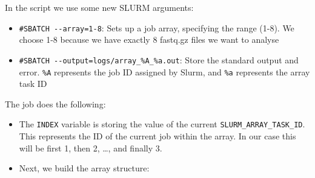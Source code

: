 \documentclass[
  letterpaper,
  DIV=11,
  numbers=noendperiod]{scrreprt}
\newenvironment{Shaded}{}{}
\newcommand{\AttributeTok}[1]{\textcolor[rgb]{0.84,0.23,0.29}{#1}}
\newcommand{\BuiltInTok}[1]{\textcolor[rgb]{0.84,0.23,0.29}{#1}}
\newcommand{\CommentTok}[1]{\textcolor[rgb]{0.42,0.45,0.49}{#1}}
\newcommand{\ExtensionTok}[1]{\textcolor[rgb]{0.84,0.23,0.29}{\textbf{#1}}}
\newcommand{\FunctionTok}[1]{\textcolor[rgb]{0.44,0.26,0.76}{#1}}
\newcommand{\KeywordTok}[1]{\textcolor[rgb]{0.84,0.23,0.29}{#1}}
\newcommand{\NormalTok}[1]{\textcolor[rgb]{0.14,0.16,0.18}{#1}}
\newcommand{\OperatorTok}[1]{\textcolor[rgb]{0.14,0.16,0.18}{#1}}
\newcommand{\PreprocessorTok}[1]{\textcolor[rgb]{0.84,0.23,0.29}{#1}}
\newcommand{\StringTok}[1]{\textcolor[rgb]{0.01,0.18,0.38}{#1}}
\newcommand{\VariableTok}[1]{\textcolor[rgb]{0.89,0.38,0.04}{#1}}
\providecommand{\tightlist}{%
  \setlength{\itemsep}{0pt}\setlength{\parskip}{0pt}}\usepackage{longtable,booktabs,array}
\begin{document}
\begin{tcolorbox}
\begin{Shaded}
\end{Shaded}

In the script we use some new SLURM arguments:

\begin{itemize}
\tightlist
\item
  \texttt{\#SBATCH\ -\/-array=1-8}: Sets up a job array, specifying the
  range (1-8). We choose 1-8 because we have exactly 8 fastq.gz files we
  want to analyse
\item
  \texttt{\#SBATCH\ -\/-output=logs/array\_\%A\_\%a.out}: Store the
  standard output and error. \texttt{\%A} represents the job ID assigned
  by Slurm, and \texttt{\%a} represents the array task ID
\end{itemize}

The job does the following:

\begin{itemize}
\tightlist
\item
  The \texttt{INDEX} variable is storing the value of the current
  \texttt{SLURM\_ARRAY\_TASK\_ID}. This represents the ID of the current
  job within the array. In our case this will be first 1, then 2,
  \ldots, and finally 3.
\item
  Next, we build the array structure:


\end{itemize}
\end{tcolorbox}
\end{document}
